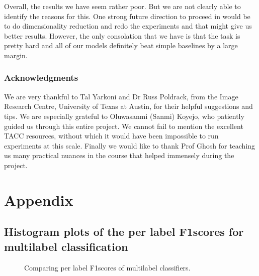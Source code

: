 \documentclass{article} %
\begin{document}
Overall, the results we have seem rather poor. But we are not clearly able to identify the reasons for this. One strong future direction to proceed in would be to do dimensionality reduction and redo the experiments and that might give us better results. However, the only consolation that we have is that the task is pretty hard and all of our models definitely beat simple baselines by a large margin.

\subsubsection*{Acknowledgments}
We are very thankful to Tal Yarkoni and Dr Russ Poldrack, from the Image Research Centre, University of Texas at Austin, for their
helpful suggestions and tips. We are especially grateful to  Oluwasanmi (Sanmi) Koyejo, who patiently guided us through this entire project.
We cannot fail to mention the excellent TACC resources, without which it would have been impossible to run experiments at this scale.
Finally we would like to thank Prof Ghosh for teaching us many practical nuances in the course that helped immensely during the project.


\nocite{*}


\section{Appendix}

\subsection{Histogram plots of the per label F1scores for multilabel classification}
\begin{figure}[!hbt]
\vspace{-0.5cm}
\centering
{} 
\caption{Comparing per label F1scores of multilabel classifiers.}
\label{fig:perlab_f1}
\end{figure}
\end{document}
